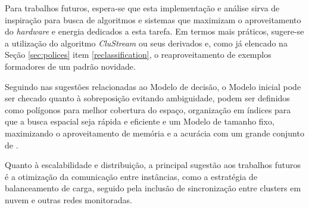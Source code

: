 Para trabalhos futuros, espera-se que esta implementação e análise sirva de
inspiração para busca de algoritmos e sistemas que maximizam o aproveitamento do
\emph{hardware} e energia dedicados a esta tarefa.
Em termos mais práticos, sugere-se a utilização do algoritmo \emph{CluStream}
\cite{Aggarwal2003} ou seus derivados e, como já elencado na Seção
\ref{sec:polices} item \ref{reclassification}, o reaproveitamento de exemplos
formadores de um padrão novidade.

Seguindo nas sugestões relacionadas ao Modelo de decisão,
o Modelo inicial pode ser checado quanto à sobreposição evitando ambiguidade,
\mclusters podem ser definidos como polígonos para melhor cobertura do espaço,
organização em índices para que a busca espacial seja rápida e eficiente e
um Modelo de tamanho fixo, maximizando o aproveitamento de memória e a acurácia
com um grande conjunto de \mclusters.

Quanto à escalabilidade e distribuição, a principal sugestão aos trabalhos
futuros é a otimização da comunicação entre instâncias, como a estratégia de
balanceamento de carga, seguido pela inclusão de sincronização entre clusters em
nuvem e outras redes monitoradas.






